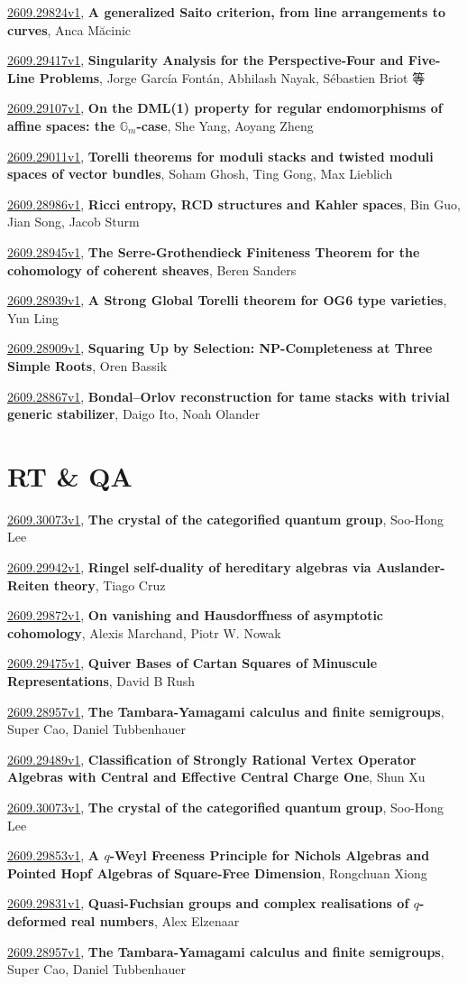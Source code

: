 \documentclass[9pt, a4paper]{article}
\theoremstyle{plain}
\theoremstyle{definition}
\theoremstyle{remark}
\newcommand{\arxiv}[3]{\href{https://arxiv.org/abs/#1}{#1}, \textbf{\textcolor{arxivblue}{#2}}, #3}
\begin{document}
\arxiv{2609.29824v1}{A generalized Saito criterion, from line arrangements to curves}{Anca Măcinic}

\arxiv{2609.29417v1}{Singularity Analysis for the Perspective-Four and Five-Line Problems}{Jorge García Fontán, Abhilash Nayak, Sébastien Briot 等}

\arxiv{2609.29107v1}{On the DML(1) property for regular endomorphisms of affine spaces: the $\mathbb{G}_m$-case}{She Yang, Aoyang Zheng}

\arxiv{2609.29011v1}{Torelli theorems for moduli stacks and twisted moduli spaces of vector bundles}{Soham Ghosh, Ting Gong, Max Lieblich}

\arxiv{2609.28986v1}{Ricci entropy, RCD structures and Kahler spaces}{Bin Guo, Jian Song, Jacob Sturm}

\arxiv{2609.28945v1}{The Serre-Grothendieck Finiteness Theorem for the cohomology of coherent sheaves}{Beren Sanders}

\arxiv{2609.28939v1}{A Strong Global Torelli theorem for OG6 type varieties}{Yun Ling}

\arxiv{2609.28909v1}{Squaring Up by Selection: NP-Completeness at Three Simple Roots}{Oren Bassik}

\arxiv{2609.28867v1}{Bondal--Orlov reconstruction for tame stacks with trivial generic stabilizer}{Daigo Ito, Noah Olander}


\section{RT \& QA}
\arxiv{2609.30073v1}{The crystal of the categorified quantum group}{Soo-Hong Lee}

\arxiv{2609.29942v1}{Ringel self-duality of hereditary algebras via Auslander-Reiten theory}{Tiago Cruz}

\arxiv{2609.29872v1}{On vanishing and Hausdorffness of asymptotic cohomology}{Alexis Marchand, Piotr W. Nowak}

\arxiv{2609.29475v1}{Quiver Bases of Cartan Squares of Minuscule Representations}{David B Rush}

\arxiv{2609.28957v1}{The Tambara-Yamagami calculus and finite semigroups}{Super Cao, Daniel Tubbenhauer}

\arxiv{2609.29489v1}{Classification of Strongly Rational Vertex Operator Algebras with Central and Effective Central Charge One}{Shun Xu}

\arxiv{2609.30073v1}{The crystal of the categorified quantum group}{Soo-Hong Lee}

\arxiv{2609.29853v1}{A $q$-Weyl Freeness Principle for Nichols Algebras and Pointed Hopf Algebras of Square-Free Dimension}{Rongchuan Xiong}

\arxiv{2609.29831v1}{Quasi-Fuchsian groups and complex realisations of $q$-deformed real numbers}{Alex Elzenaar}

\arxiv{2609.28957v1}{The Tambara-Yamagami calculus and finite semigroups}{Super Cao, Daniel Tubbenhauer}

\end{document}
